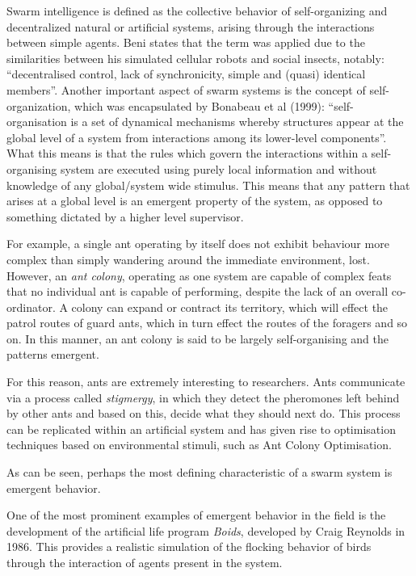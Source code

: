 Swarm intelligence is defined as the collective behavior of self-organizing and decentralized natural or artificial systems, arising through the interactions between simple agents. \cite{Beni1989} Beni states that the term was applied due to the similarities between his simulated cellular robots and social insects, notably: ``decentralised control, lack of synchronicity, simple and (quasi) identical members''. Another important aspect of swarm systems is the concept of self-organization, which was encapsulated by Bonabeau et al (1999): ``self-organisation is a set of dynamical mechanisms whereby structures appear at the global level of a system from interactions among its lower-level components''. \cite{bonabeau} What this means is that the rules which govern the interactions within a self-organising system are executed using purely local information and without knowledge of any global/system wide stimulus. This means that any pattern that arises at a global level is an emergent property of the system, as opposed to something dictated by a higher level supervisor. 

For example, a single ant operating by itself does not exhibit behaviour more complex than simply wandering around the immediate environment, lost. However, an \textit{ant colony}, operating as one system are capable of complex feats that no individual ant is capable of performing, despite the lack of an overall co-ordinator. \cite{ants} A colony can expand or contract its territory, which will effect the patrol routes of guard ants, which in turn effect the routes of the foragers and so on. In this manner, an ant colony is said to be largely self-organising and the patterns emergent.

For this reason, ants are extremely interesting to researchers. Ants communicate via a process called \textit{stigmergy}, in which they detect the pheromones left behind by other ants and based on this, decide what they should next do. This process can be replicated within an artificial system and has given rise to optimisation techniques based on environmental stimuli, such as Ant Colony Optimisation.

As can be seen, perhaps the most defining characteristic of a swarm system is emergent behavior. 

One of the most prominent examples of emergent behavior in the field is the development of the artificial life program \textit{Boids}, developed by Craig Reynolds in 1986. This provides a realistic simulation of the flocking behavior of birds through the interaction of agents present in the system.

